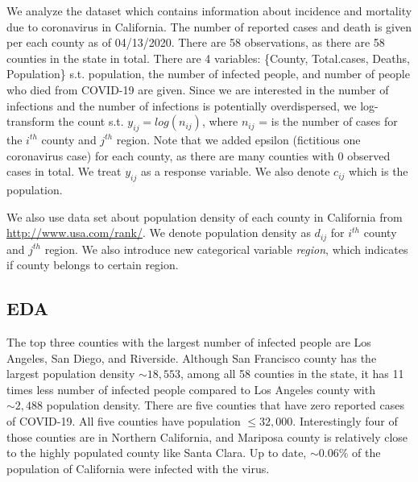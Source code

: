 \documentclass[11pt,twocolumn]{asaproc}
\begin{document}
We analyze the dataset which contains information about incidence and mortality due to coronavirus in California. The number of reported cases and death is given per each county as of 04/13/2020. There are 58 observations, as there are 58 counties in the state in total. There are 4 variables: \{County, Total.cases, Deaths, Population\} s.t. population, the number of infected people, and number of people who died from COVID-19 are given. Since we are interested in the number of infections and the number of infections is potentially overdispersed, we log-transform the count s.t. $y_{ij} = log(n_{ij})$, where $n_{ij}$ = is the number of cases for the $i^{th}$ county and $j^{th}$ region. Note that we added epsilon (fictitious one coronavirus case) for each county, as there are many counties with 0 observed cases in total. We treat $y_{ij}$ as a response variable. We also denote $c_{ij}$ which is the population. 

We also use data set about population density of each county in California from \url{http://www.usa.com/rank/}. We denote population density as $d_{ij}$ for $i^{th}$ county and $j^{th}$ region. We also introduce new categorical variable \textit{region}, which indicates if county belongs to certain region.


\subsection{EDA}
The top three counties with the largest number of infected people are Los Angeles, San Diego, and Riverside.  Although San Francisco county has the largest population density $\sim18,553$, among all 58 counties in the state, it has 11 times less number of infected people compared to Los Angeles county with $\sim2,488$ population density. There are five counties that have zero reported cases of COVID-19. All five counties have population $\leq 32,000$. Interestingly four of those counties are in Northern California, and Mariposa county is relatively close to the highly populated county like Santa Clara. Up to date, $\sim 0.06\%$ of the population of California were infected with the virus. 
\end{document}
